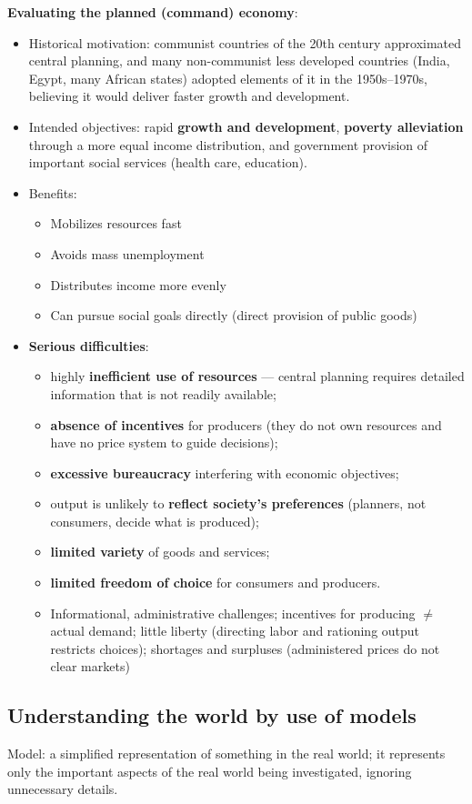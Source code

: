 \documentclass[a4paper,12pt]{article}
\begin{document}
\textbf{Evaluating the planned (command) economy}:
\begin{itemize}
  \item Historical motivation: communist countries of the 20th century approximated central planning, and many non-communist less developed countries (India, Egypt, many African states) adopted elements of it in the 1950s--1970s, believing it would deliver faster growth and development.
  \item Intended objectives: rapid \textbf{growth and development}, \textbf{poverty alleviation} through a more equal income distribution, and government provision of important social services (health care, education).
  \item Benefits:
  \begin{itemize}
  	\item Mobilizes resources fast
	\item Avoids mass unemployment
	\item Distributes income more evenly
	\item Can pursue social goals directly (direct provision of public goods)
  \end{itemize}
  \item \textbf{Serious difficulties}:
  \begin{itemize}
    \item highly \textbf{inefficient use of resources} --- central planning requires detailed information that is not readily available;
    \item \textbf{absence of incentives} for producers (they do not own resources and have no price system to guide decisions);
    \item \textbf{excessive bureaucracy} interfering with economic objectives;
    \item output is unlikely to \textbf{reflect society's preferences} (planners, not consumers, decide what is produced);
    \item \textbf{limited variety} of goods and services;
    \item \textbf{limited freedom of choice} for consumers and producers.
    \item Informational, administrative challenges; incentives for producing $\neq$ actual demand; little liberty (directing labor and rationing output restricts choices); shortages and surpluses (administered prices do not clear markets)
  \end{itemize}
\end{itemize}
\subsection{Understanding the world by use of models}
Model: a simplified representation of something in the real world; it represents only the important aspects of the real world being investigated, ignoring unnecessary details.
\end{document}

